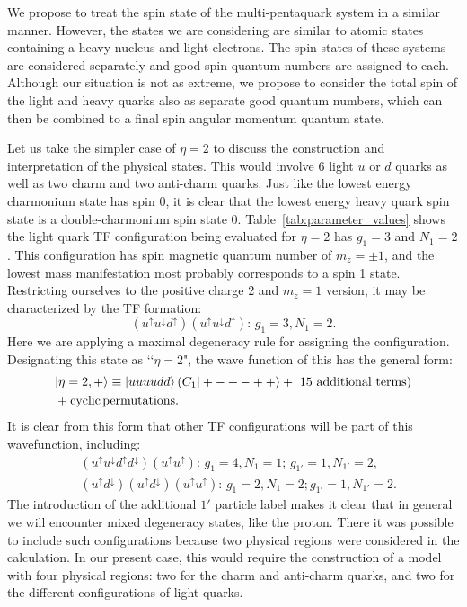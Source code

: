 \documentclass[fleqn]{article}
\begin{document}
We propose to treat the spin state of the multi-pentaquark system in a similar manner. However, the states we are considering are similar to atomic states containing a heavy nucleus and light electrons. The spin states of these systems are considered separately and good spin quantum numbers are assigned to each. Although our situation is not as extreme, we propose to consider the total spin of the light and heavy quarks also as separate good quantum numbers, which can then be combined to a final spin angular momentum quantum state. 

Let us take the simpler case of $\eta=2$ to discuss the construction and interpretation of the physical states. This would involve 6 light $u$ or $d$ quarks as well as two charm and two anti-charm quarks. Just like the lowest energy charmonium state has spin 0, it is clear that the lowest energy heavy quark spin state is a double-charmonium spin state 0. Table~\ref{tab:parameter_values} shows the light quark TF configuration being evaluated for $\eta=2$ has $g_1=3$ and $N_1=2$. This configuration has spin magnetic quantum number of $m_z=\pm 1$, and the lowest mass manifestation most probably corresponds to a spin 1 state. Restricting ourselves to the positive charge 2 and $m_z=1$ version, it may be characterized by the TF formation:
\begin{equation*}
(u^{\uparrow}u^{\downarrow}d^{\uparrow})(u^{\uparrow}u^{\downarrow}d^{\uparrow}): \, g_1=3, N_1=2.
\end{equation*}
Here we are applying a maximal degeneracy rule for assigning the configuration. Designating this state as \lq\lq $\eta=2$", the wave function of this has the general form:
\begin{eqnarray}
&|\eta=2,+\rangle\equiv |uuuudd\rangle \left(C_1|+-+-++\rangle+\text{ 15 additional terms}\right) \nonumber\\&+{\rm cyclic\, permutations}.\label{proton}
\end{eqnarray}
It is clear from this form that other TF configurations will be part of this wavefunction, including:
\begin{eqnarray*}
& (u^{\uparrow}u^{\downarrow}d^{\uparrow}d^{\downarrow})(u^{\uparrow}u^{\uparrow}): \, g_1=4, N_1=1;\, g_{1'}=1, N_{1'}=2,\\ 
& (u^{\uparrow}d^{\downarrow})(u^{\uparrow}d^{\downarrow})(u^{\uparrow}u^{\uparrow}): \, g_1=2, N_1=2; g_{1'}=1,N_{1'}=2. 
\end{eqnarray*}
The introduction of the additional $1'$ particle label makes it clear that in general we will encounter mixed degeneracy states, like the proton. There it was possible to include such configurations because two physical regions were considered in the calculation. In our present case, this would require the construction of a model with four physical regions: two for the charm and anti-charm quarks, and two for the different configurations of light quarks.
\end{document}
